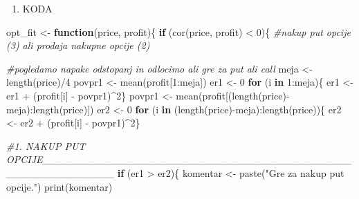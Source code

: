 \documentclass[
]{article}
\newenvironment{Shaded}{\begin{snugshade}}{\end{snugshade}}
\newcommand{\CommentTok}[1]{\textcolor[rgb]{0.56,0.35,0.01}{\textit{#1}}}
\newcommand{\ControlFlowTok}[1]{\textcolor[rgb]{0.13,0.29,0.53}{\textbf{#1}}}
\newcommand{\DecValTok}[1]{\textcolor[rgb]{0.00,0.00,0.81}{#1}}
\newcommand{\FunctionTok}[1]{\textcolor[rgb]{0.00,0.00,0.00}{#1}}
\newcommand{\NormalTok}[1]{#1}
\newcommand{\OtherTok}[1]{\textcolor[rgb]{0.56,0.35,0.01}{#1}}
\newcommand{\SpecialCharTok}[1]{\textcolor[rgb]{0.00,0.00,0.00}{#1}}
\newcommand{\StringTok}[1]{\textcolor[rgb]{0.31,0.60,0.02}{#1}}
\providecommand{\tightlist}{%
  \setlength{\itemsep}{0pt}\setlength{\parskip}{0pt}}
\begin{document}
\begin{enumerate}
\def\labelenumi{\arabic{enumi}.}
\setcounter{enumi}{4}
\tightlist
\item
  KODA
\end{enumerate}

\begin{Shaded}
\begin{Highlighting}[]
\NormalTok{opt\_fit }\OtherTok{\textless{}{-}} \ControlFlowTok{function}\NormalTok{(price, profit)\{}
  \ControlFlowTok{if}\NormalTok{ (}\FunctionTok{cor}\NormalTok{(price, profit) }\SpecialCharTok{\textless{}} \DecValTok{0}\NormalTok{)\{}
    \CommentTok{\#nakup put opcije (3) ali prodaja nakupne opcije (2)}
    
    \CommentTok{\#pogledamo napake odstopanj in odlocimo ali gre za put ali call}
\NormalTok{    meja }\OtherTok{\textless{}{-}} \FunctionTok{length}\NormalTok{(price)}\SpecialCharTok{/}\DecValTok{4}
\NormalTok{    povpr1 }\OtherTok{\textless{}{-}} \FunctionTok{mean}\NormalTok{(profit[}\DecValTok{1}\SpecialCharTok{:}\NormalTok{meja])}
\NormalTok{    er1 }\OtherTok{\textless{}{-}} \DecValTok{0}
    \ControlFlowTok{for}\NormalTok{ (i }\ControlFlowTok{in} \DecValTok{1}\SpecialCharTok{:}\NormalTok{meja)\{}
\NormalTok{      er1 }\OtherTok{\textless{}{-}}\NormalTok{ er1 }\SpecialCharTok{+}\NormalTok{ (profit[i] }\SpecialCharTok{{-}}\NormalTok{ povpr1)}\SpecialCharTok{\^{}}\DecValTok{2}\NormalTok{\}}
\NormalTok{    povpr1 }\OtherTok{\textless{}{-}} \FunctionTok{mean}\NormalTok{(profit[(}\FunctionTok{length}\NormalTok{(price)}\SpecialCharTok{{-}}\NormalTok{meja)}\SpecialCharTok{:}\FunctionTok{length}\NormalTok{(price)])}
\NormalTok{    er2 }\OtherTok{\textless{}{-}} \DecValTok{0}
    \ControlFlowTok{for}\NormalTok{ (i }\ControlFlowTok{in}\NormalTok{ (}\FunctionTok{length}\NormalTok{(price)}\SpecialCharTok{{-}}\NormalTok{meja)}\SpecialCharTok{:}\FunctionTok{length}\NormalTok{(price))\{}
\NormalTok{      er2 }\OtherTok{\textless{}{-}}\NormalTok{ er2 }\SpecialCharTok{+}\NormalTok{ (profit[i] }\SpecialCharTok{{-}}\NormalTok{ povpr1)}\SpecialCharTok{\^{}}\DecValTok{2}\NormalTok{\}}
    
    
    \CommentTok{\#1. NAKUP PUT OPCIJE\_\_\_\_\_\_\_\_\_\_\_\_\_\_\_\_\_\_\_\_\_\_\_\_\_\_\_\_\_\_\_\_\_\_\_\_\_\_\_\_\_\_\_\_\_\_\_\_\_\_\_\_\_\_\_\_\_\_}
    \ControlFlowTok{if}\NormalTok{ (er1 }\SpecialCharTok{\textgreater{}}\NormalTok{ er2)\{}
\NormalTok{      komentar }\OtherTok{\textless{}{-}} \FunctionTok{paste}\NormalTok{(}\StringTok{"Gre za nakup put opcije."}\NormalTok{)}
      \FunctionTok{print}\NormalTok{(komentar)}
      

\end{Highlighting}
\end{Shaded}
\end{document}
